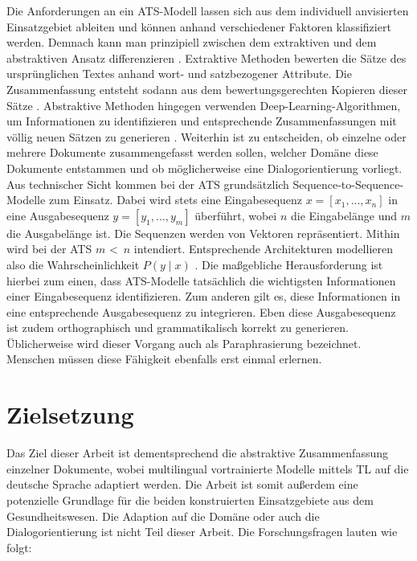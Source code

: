 \noindent
Die Anforderungen an ein \ac{ATS}-Modell lassen sich aus dem individuell anvisierten Einsatzgebiet ableiten und können anhand verschiedener Faktoren klassifiziert werden. Demnach kann man prinzipiell zwischen dem extraktiven und dem abstraktiven Ansatz differenzieren \cite[S.~5]{GAM16}. Extraktive Methoden bewerten die Sätze des ursprünglichen Textes anhand wort- und satzbezogener Attribute. Die Zusammenfassung entsteht sodann aus dem bewertungsgerechten Kopieren dieser Sätze \cite[S.~205-207]{KIA17}. Abstraktive Methoden hingegen verwenden Deep-Learning-Algorithmen, um Informationen zu identifizieren und entsprechende Zusammenfassungen mit völlig neuen Sätzen zu generieren \cite[S.~1]{NIT19}. Weiterhin ist zu entscheiden, ob einzelne oder mehrere Dokumente zusammengefasst werden sollen, welcher Domäne diese Dokumente entstammen und ob möglicherweise eine Dialogorientierung vorliegt.\\

\noindent
Aus technischer Sicht kommen bei der \ac{ATS} grundsätzlich Sequence-to-Sequence-Modelle zum Einsatz. Dabei wird stets eine Eingabesequenz $x = [x_{1}, ..., x_{n}]$ in eine Ausgabesequenz $y = [y_{1}, ..., y_{m}]$ überführt, wobei $n$ die Eingabelänge und $m$ die Ausgabelänge ist. Die Sequenzen werden von Vektoren repräsentiert. Mithin wird bei der \ac{ATS} $m$ \textless \, $n$ intendiert. Entsprechende Architekturen modellieren also die Wahrscheinlichkeit $P(y \mid x)$ \cite[S.~32-33]{NIT19}. Die maßgebliche Herausforderung ist hierbei zum einen, dass \ac{ATS}-Modelle tatsächlich die wichtigsten Informationen einer Eingabesequenz identifizieren. Zum anderen gilt es, diese Informationen in eine entsprechende Ausgabesequenz zu integrieren. Eben diese Ausgabesequenz ist zudem orthographisch und grammatikalisch korrekt zu generieren. Üblicherweise wird dieser Vorgang auch als Paraphrasierung bezeichnet. Menschen müssen diese Fähigkeit ebenfalls erst einmal erlernen.


\section{Zielsetzung}
\noindent
Das Ziel dieser Arbeit ist dementsprechend die abstraktive Zusammenfassung einzelner Dokumente, wobei multilingual vortrainierte Modelle mittels \ac{TL} auf die deutsche Sprache adaptiert werden. Die Arbeit ist somit außerdem eine potenzielle Grundlage für die beiden konstruierten Einsatzgebiete aus dem Gesundheitswesen. Die Adaption auf die Domäne oder auch die Dialogorientierung ist nicht Teil dieser Arbeit. Die Forschungsfragen lauten wie folgt:

